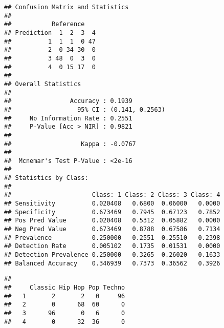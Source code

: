 \documentclass[
]{article}
\newenvironment{Shaded}{\begin{snugshade}}{\end{snugshade}}
\newcommand{\CommentTok}[1]{\textcolor[rgb]{0.56,0.35,0.01}{\textit{#1}}}
\newcommand{\DataTypeTok}[1]{\textcolor[rgb]{0.13,0.29,0.53}{#1}}
\newcommand{\DecValTok}[1]{\textcolor[rgb]{0.00,0.00,0.81}{#1}}
\newcommand{\KeywordTok}[1]{\textcolor[rgb]{0.13,0.29,0.53}{\textbf{#1}}}
\newcommand{\NormalTok}[1]{#1}
\newcommand{\OperatorTok}[1]{\textcolor[rgb]{0.81,0.36,0.00}{\textbf{#1}}}
\newcommand{\StringTok}[1]{\textcolor[rgb]{0.31,0.60,0.02}{#1}}
\begin{document}
\begin{verbatim}
## Confusion Matrix and Statistics
## 
##           Reference
## Prediction  1  2  3  4
##          1  1  1  0 47
##          2  0 34 30  0
##          3 48  0  3  0
##          4  0 15 17  0
## 
## Overall Statistics
##                                          
##                Accuracy : 0.1939         
##                  95% CI : (0.141, 0.2563)
##     No Information Rate : 0.2551         
##     P-Value [Acc > NIR] : 0.9821         
##                                          
##                   Kappa : -0.0767        
##                                          
##  Mcnemar's Test P-Value : <2e-16         
## 
## Statistics by Class:
## 
##                      Class: 1 Class: 2 Class: 3 Class: 4
## Sensitivity          0.020408   0.6800  0.06000   0.0000
## Specificity          0.673469   0.7945  0.67123   0.7852
## Pos Pred Value       0.020408   0.5312  0.05882   0.0000
## Neg Pred Value       0.673469   0.8788  0.67586   0.7134
## Prevalence           0.250000   0.2551  0.25510   0.2398
## Detection Rate       0.005102   0.1735  0.01531   0.0000
## Detection Prevalence 0.250000   0.3265  0.26020   0.1633
## Balanced Accuracy    0.346939   0.7373  0.36562   0.3926
\end{verbatim}

\begin{Shaded}
\end{Shaded}

\begin{verbatim}
##    
##     Classic Hip Hop Pop Techno
##   1       2       2   0     96
##   2       0      68  60      0
##   3      96       0   6      0
##   4       0      32  36      0
\end{verbatim}

\begin{Shaded}
\end{Shaded}
\end{document}
